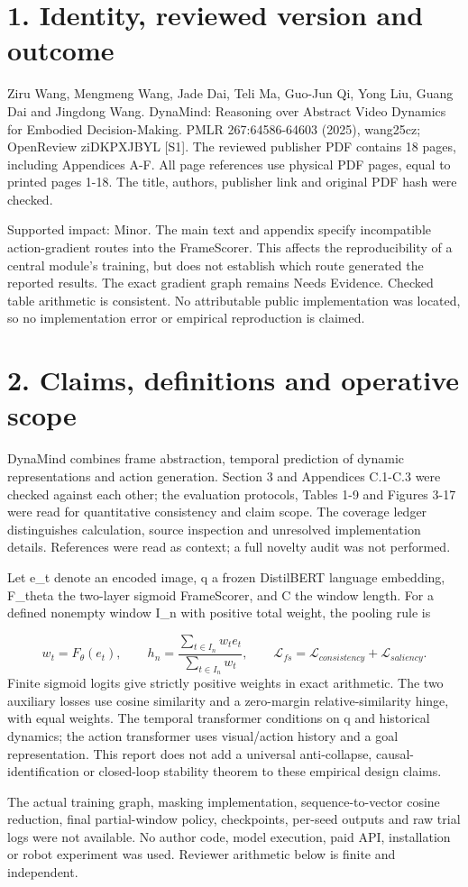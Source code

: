 \documentclass[10pt]{article}
\begin{document}
\section*{1. Identity, reviewed version and outcome}
Ziru Wang, Mengmeng Wang, Jade Dai, Teli Ma, Guo-Jun Qi, Yong Liu, Guang Dai and Jingdong Wang. DynaMind: Reasoning over Abstract Video Dynamics for Embodied Decision-Making. PMLR 267:64586-64603 (2025), wang25cz; OpenReview ziDKPXJBYL [S1]. The reviewed publisher PDF contains 18 pages, including Appendices A-F. All page references use physical PDF pages, equal to printed pages 1-18. The title, authors, publisher link and original PDF hash were checked.\par
Supported impact: Minor. The main text and appendix specify incompatible action-gradient routes into the FrameScorer. This affects the reproducibility of a central module’s training, but does not establish which route generated the reported results. The exact gradient graph remains Needs Evidence. Checked table arithmetic is consistent. No attributable public implementation was located, so no implementation error or empirical reproduction is claimed.\par
\section*{2. Claims, definitions and operative scope}
DynaMind combines frame abstraction, temporal prediction of dynamic representations and action generation. Section 3 and Appendices C.1-C.3 were checked against each other; the evaluation protocols, Tables 1-9 and Figures 3-17 were read for quantitative consistency and claim scope. The coverage ledger distinguishes calculation, source inspection and unresolved implementation details. References were read as context; a full novelty audit was not performed.\par
Let e\_t denote an encoded image, q a frozen DistilBERT language embedding, F\_theta the two-layer sigmoid FrameScorer, and C the window length. For a defined nonempty window I\_n with positive total weight, the pooling rule is\par
\[w_t=F_\theta(e_t),\qquad h_n=\frac{\sum_{t\in I_n}w_t e_t}{\sum_{t\in I_n}w_t},\qquad \mathcal{L}_{fs}=\mathcal{L}_{consistency}+\mathcal{L}_{saliency}.\] Finite sigmoid logits give strictly positive weights in exact arithmetic. The two auxiliary losses use cosine similarity and a zero-margin relative-similarity hinge, with equal weights. The temporal transformer conditions on q and historical dynamics; the action transformer uses visual/action history and a goal representation. This report does not add a universal anti-collapse, causal-identification or closed-loop stability theorem to these empirical design claims.\par
The actual training graph, masking implementation, sequence-to-vector cosine reduction, final partial-window policy, checkpoints, per-seed outputs and raw trial logs were not available. No author code, model execution, paid API, installation or robot experiment was used. Reviewer arithmetic below is finite and independent.\par
\end{document}
